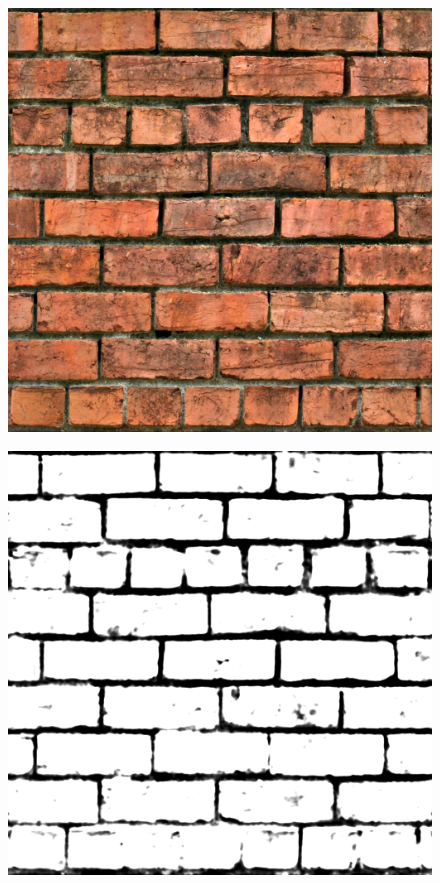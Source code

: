 \documentclass[a4paper, 13pt]{extarticle}
\begin{document}
		 \begin{figure}[h]
		 	\centering
		 	\begin{minipage}{.3\textwidth}
		 		\centering
		 		\includegraphics[width=0.8\linewidth]{intructions/Brick001.jpg}
		 		\centering
		 		\label{fig:test16}
		 	\end{minipage}
	 		\begin{minipage}{.3\textwidth}
	 			\centering
	 			\includegraphics[width=0.8\linewidth]{intructions/Brick001_height.png}
	 			\centering
	 			\label{fig:test17}

\end{minipage}
\end{figure}
\end{document}
